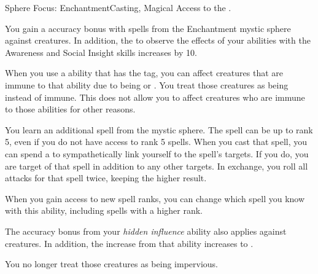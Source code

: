   \begin{magicalfeat}{Sphere Focus: Enchantment}{Casting, Magical}
    \featpre Access to the  .

     You gain a  accuracy bonus with spells from the Enchantment mystic sphere against \unaware creatures.
    In addition, the  to observe the effects of your  abilities with the Awareness and Social Insight skills increases by 10.

     When you use a \magical ability that has the  tag, you can affect creatures that are immune to that ability due to being  or .
    You treat those creatures as being \impervious instead of immune.
    This does not allow you to affect creatures who are immune to those abilities for other reasons.

     You learn an additional  spell from the  mystic sphere.
    The spell can be up to rank 5, even if you do not have access to rank 5 spells.
    When you cast that spell, you can spend a  to sympathetically link yourself to the spell's targets.
    If you do, you are target of that spell in addition to any other targets.
    In exchange, you roll all attacks for that spell twice, keeping the higher result.

    When you gain access to new spell ranks, you can change which spell you know with this ability, including spells with a higher rank.

     The accuracy bonus from your \textit{hidden influence} ability also applies against \partiallyunaware creatures.
    In addition, the  increase from that ability increases to .

     You no longer treat those creatures as being impervious.
  \end{magicalfeat}

